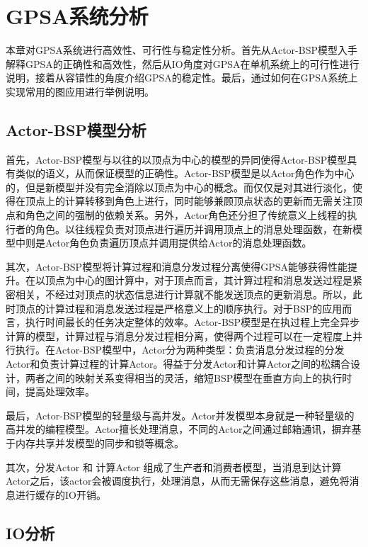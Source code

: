 
\chapter{GPSA系统分析}
本章对GPSA系统进行高效性、可行性与稳定性分析。首先从Actor-BSP模型入手解释GPSA的正确性和高效性，然后从IO角度对GPSA在单机系统上的可行性进行说明，接着从容错性的角度介绍GPSA的稳定性。最后，通过如何在GPSA系统上实现常用的图应用进行举例说明。

\section{Actor-BSP模型分析}
首先，Actor-BSP模型与以往的以顶点为中心的模型的异同使得Actor-BSP模型具有类似的语义，从而保证模型的正确性。Actor-BSP模型是以Actor角色作为中心的，但是新模型并没有完全消除以顶点为中心的概念。而仅仅是对其进行淡化，使得在顶点上的计算转移到角色上进行，同时能够兼顾顶点状态的更新而无需关注顶点和角色之间的强制的依赖关系。另外，Actor角色还分担了传统意义上线程的执行者的角色。以往线程负责对顶点进行遍历并调用顶点上的消息处理函数，在新模型中则是Actor角色负责遍历顶点并调用提供给Actor的消息处理函数。

其次，Actor-BSP模型将计算过程和消息分发过程分离使得GPSA能够获得性能提升。在以顶点为中心的图计算中，对于顶点而言，其计算过程和消息发送过程是紧密相关，不经过对顶点的状态信息进行计算就不能发送顶点的更新消息。所以，此时顶点的计算过程和消息发送过程是严格意义上的顺序执行。对于BSP的应用而言，执行时间最长的任务决定整体的效率。Actor-BSP模型是在执过程上完全异步计算的模型，计算过程与消息分发过程相分离，使得两个过程可以在一定程度上并行执行。在Actor-BSP模型中，Actor分为两种类型：负责消息分发过程的分发Actor和负责计算过程的计算Actor。得益于分发Actor和计算Actor之间的松耦合设计，两者之间的映射关系变得相当的灵活，缩短BSP模型在垂直方向上的执行时间，提高处理效率。

最后，Actor-BSP模型的轻量级与高并发。Actor并发模型本身就是一种轻量级的高并发的编程模型。Actor擅长处理消息，不同的Actor之间通过邮箱通讯，摒弃基于内存共享并发模型的同步和锁等概念。



其次，分发Actor 和 计算Actor 组成了生产者和消费者模型，当消息到达计算Actor之后，该actor会被调度执行，处理消息，从而无需保存这些消息，避免将消息进行缓存的IO开销。

\section{IO分析}

